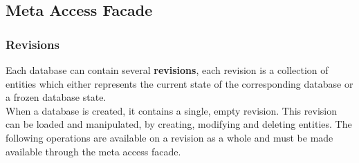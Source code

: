 \documentclass[a4paper, 10pt]{book}
\begin{document}
                                \subsection{Meta Access Facade}
                                \label{sec:meta-access-facade}


                                \subsubsection{Revisions}
                                \label{sec:revisions}

                                Each database can contain several \textbf{revisions}, each
                                revision is a collection of entities which either represents the
                                current state of the corresponding database or a frozen database
                                state.\\
                                When a database is created, it contains a single, empty revision. This
                                revision can be loaded and manipulated, by creating, modifying and
                                deleting entities. The following operations are available on a
                                revision as a whole and must be made available through the meta access
                                facade.
\end{document}
